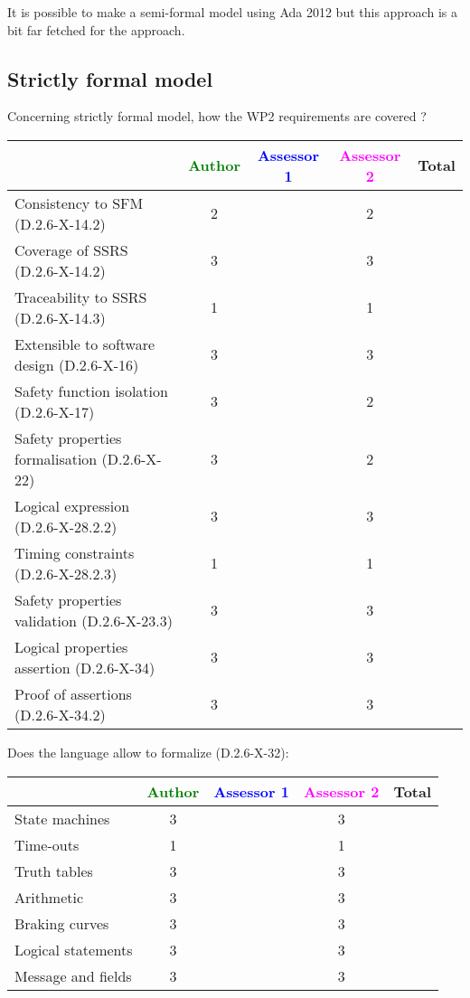 It is possible to make a semi-formal model using Ada 2012 but this
approach is a bit far fetched for the approach.

\subsection{Strictly formal model}

Concerning strictly formal model, how the WP2 requirements are covered ?

\begin{tabular}{|l | c | c | c | c|}
\hline
& \textcolor{green}{Author} & \textcolor{blue}{Assessor 1} & \textcolor{magenta}{Assessor 2} & Total \\
\hline 
Consistency to SFM (D.2.6-X-14.2) & 2 & & 2 &  \\
\hline
Coverage of SSRS (D.2.6-X-14.2)  & 3 & & 3 &  \\
\hline
Traceability to  SSRS (D.2.6-X-14.3)  & 1 & & 1 &  \\
\hline
Extensible to software design (D.2.6-X-16)  & 3 & & 3 &  \\
\hline
Safety function isolation (D.2.6-X-17)  & 3 & & 2 &  \\
\hline 
Safety properties formalisation (D.2.6-X-22)  & 3 & & 2 &  \\
\hline
Logical expression (D.2.6-X-28.2.2)  & 3 & & 3 &  \\
\hline
Timing constraints (D.2.6-X-28.2.3)  & 1 & & 1 &  \\
\hline
Safety properties validation (D.2.6-X-23.3)  & 3 & & 3 &  \\
\hline
Logical properties assertion (D.2.6-X-34)  & 3 & & 3 &  \\
\hline
Proof of assertions (D.2.6-X-34.2)  & 3 & & 3 &  \\
\hline
\end{tabular}

Does the language allow to  formalize (D.2.6-X-32):

\begin{tabular}{|l | c | c | c | c|}
\hline
& \textcolor{green}{Author} & \textcolor{blue}{Assessor 1} & \textcolor{magenta}{Assessor 2} & Total \\
\hline 
State machines  & 3 & & 3 &  \\
\hline
Time-outs  & 1 & & 1 &  \\
\hline
Truth tables  & 3 & & 3 &  \\
\hline
Arithmetic  & 3 & & 3 &  \\
\hline
Braking curves  & 3 & & 3 &  \\
\hline
Logical statements & 3 & & 3 &  \\
\hline
Message and fields & 3 & & 3 &  \\
\hline
\end{tabular}

